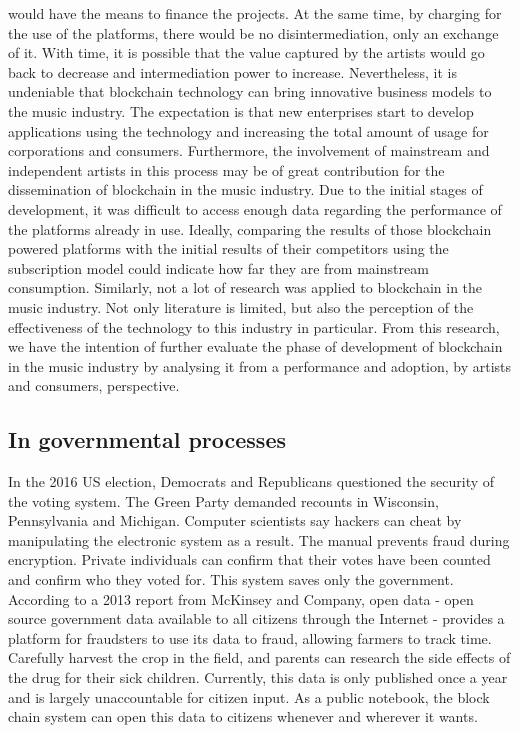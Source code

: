 would have the means to finance the projects. At the same time, by charging for the use of the
platforms, there would be no disintermediation, only an exchange of it. With time, it is possible that
the value captured by the artists would go back to decrease and intermediation power to increase.
Nevertheless, it is undeniable that blockchain technology can bring innovative business models to
the music industry. The expectation is that new enterprises start to develop applications using the
technology and increasing the total amount of usage for corporations and consumers. Furthermore,
the involvement of mainstream and independent artists in this process may be of great contribution
for the dissemination of blockchain in the music industry.
Due to the initial stages of development, it was difficult to access enough data regarding the
performance of the platforms already in use. Ideally, comparing the results of those blockchain
powered platforms with the initial results of their competitors using the subscription model could
indicate how far they are from mainstream consumption. Similarly, not a lot of research was applied
to blockchain in the music industry. Not only literature is limited, but also the perception of the
effectiveness of the technology to this industry in particular.
From this research, we have the intention of further evaluate the phase of development of
blockchain in the music industry by analysing it from a performance and adoption, by artists and
consumers, perspective.\textcite{sitonio2018impact}

\subsection{In governmental processes}
In the 2016 US election, Democrats and Republicans questioned the security of the voting system. The Green Party demanded recounts in Wisconsin, Pennsylvania and Michigan. Computer scientists say hackers can cheat by manipulating the electronic system as a result. The manual prevents fraud during encryption. Private individuals can confirm that their votes have been counted and confirm who they voted for. This system saves only the government.
According to a 2013 report from McKinsey and Company, open data - open source government data available to all citizens through the Internet - provides a platform for fraudsters to use its data to fraud, allowing farmers to track time. Carefully harvest the crop in the field, and parents can research the side effects of the drug for their sick children. Currently, this data is only published once a year and is largely unaccountable for citizen input. As a public notebook, the block chain system can open this data to citizens whenever and wherever it wants.

